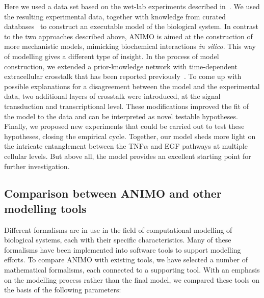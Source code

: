 \documentclass{bmcart}
\begin{document}
Here we used a data set based on the wet-lab experiments described in~\cite{pathway-compendium}. We used the
resulting experimental data, together with knowledge from curated databases~\cite{kegg,phosphosite}
to construct an executable model of the biological system.
In contrast to the two approaches described above, ANIMO is aimed at the construction of
more mechanistic models, mimicking biochemical interactions \emph{in silico}. This way of modelling
gives a different type of insight. In the process of model construction, we extended a
prior-knowledge network with time-dependent extracellular crosstalk that has been reported
previously~\cite{pathway-autocrine}. To come up with possible explanations for a disagreement
between the model and the experimental data, two additional layers of
crosstalk were introduced, at the signal transduction and transcriptional level. These modifications
improved the fit of the model to the data and can be interpreted as novel testable hypotheses.
Finally, we proposed new experiments that could be carried out to test these hypotheses, closing the empirical cycle.
Together, our model sheds more light on the intricate
entanglement between the TNF$\alpha$ and EGF pathways at multiple cellular levels.
But above all,  the model provides an excellent starting point for further investigation.


\subsection*{Comparison between ANIMO and other modelling tools}\label{suppl:comparison-table}
Different formalisms are in use in the field of computational
modelling of biological systems, each with their specific characteristics.
Many of these formalisms have been implemented into
software tools to support modelling efforts. To compare
ANIMO with existing tools, we have selected a number of mathematical formalisms,
each connected to a supporting tool. With an emphasis on the modelling
process rather than the final model, we compared these tools on
the basis of the following parameters:
\end{document}
